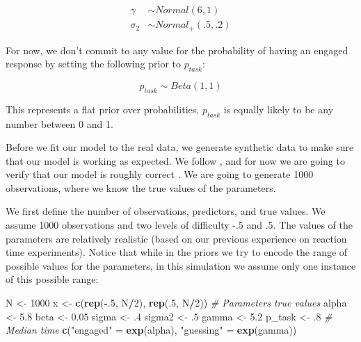 \documentclass[12pt,]{krantz}
\newenvironment{Shaded}{\begin{snugshade}}{\end{snugshade}}
\newcommand{\KeywordTok}[1]{\textcolor[rgb]{0.13,0.29,0.53}{\textbf{#1}}}
\newcommand{\DecValTok}[1]{\textcolor[rgb]{0.00,0.00,0.81}{#1}}
\newcommand{\FloatTok}[1]{\textcolor[rgb]{0.00,0.00,0.81}{#1}}
\newcommand{\StringTok}[1]{\textcolor[rgb]{0.31,0.60,0.02}{#1}}
\newcommand{\CommentTok}[1]{\textcolor[rgb]{0.56,0.35,0.01}{\textit{#1}}}
\newcommand{\OperatorTok}[1]{\textcolor[rgb]{0.81,0.36,0.00}{\textbf{#1}}}
\newcommand{\NormalTok}[1]{#1}
\theoremstyle{definition}
\theoremstyle{definition}
\theoremstyle{definition}
\theoremstyle{remark}
\begin{document}
\begin{equation}
\begin{aligned}
\gamma &\sim Normal(6, 1)\\
\sigma_2 &\sim Normal_+(.5, .2)
\end{aligned}
\end{equation}

For now, we don't commit to any value for the probability of having an
engaged response by setting the following prior to \(p_{task}\):

\begin{equation}
p_{task} \sim Beta(1, 1)
\end{equation}

This represents a flat prior over probabilities, \(p_{task}\) is equally
likely to be any number between 0 and 1.

Before we fit our model to the real data, we generate synthetic data to
make sure that our model is working as expected. We follow
\citet{Cooketal2006}, and for now we are going to verify that our model
is roughly correct \citetext{\citealp[a more thorough approach is
presented in][]{talts2018validating}; \citealp[and][]{schad2020toward}}.
We are going to generate 1000 observations, where we know the true
values of the parameters.

We first define the number of observations, predictors, and true values.
We assume 1000 observations and two levels of difficulty -.5 and .5. The
values of the parameters are relatively realistic (based on our previous
experience on reaction time experiments). Notice that while in the
priors we try to encode the range of possible values for the parameters,
in this simulation we assume only one instance of this possible range:

\begin{Shaded}
\begin{Highlighting}[]
\NormalTok{N <-}\StringTok{ }\DecValTok{1000}
\NormalTok{x <-}\StringTok{ }\KeywordTok{c}\NormalTok{(}\KeywordTok{rep}\NormalTok{(}\OperatorTok{-}\NormalTok{.}\DecValTok{5}\NormalTok{, N}\OperatorTok{/}\DecValTok{2}\NormalTok{), }\KeywordTok{rep}\NormalTok{(.}\DecValTok{5}\NormalTok{, N}\OperatorTok{/}\DecValTok{2}\NormalTok{))}
\CommentTok{# Parameters true values}
\NormalTok{alpha <-}\StringTok{ }\FloatTok{5.8}
\NormalTok{beta <-}\StringTok{ }\FloatTok{0.05}
\NormalTok{sigma <-}\StringTok{ }\FloatTok{.4}
\NormalTok{sigma2 <-}\StringTok{ }\FloatTok{.5}
\NormalTok{gamma <-}\StringTok{ }\FloatTok{5.2}
\NormalTok{p_task <-}\StringTok{ }\FloatTok{.8}
\CommentTok{# Median time}
\KeywordTok{c}\NormalTok{(}\StringTok{"engaged"}\NormalTok{ =}\StringTok{ }\KeywordTok{exp}\NormalTok{(alpha), }\StringTok{"guessing"}\NormalTok{ =}\StringTok{ }\KeywordTok{exp}\NormalTok{(gamma))}
\end{Highlighting}
\end{Shaded}
\end{document}
